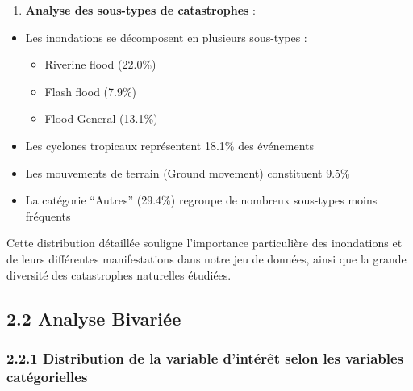 \documentclass[
]{article}
\providecommand{\tightlist}{%
  \setlength{\itemsep}{0pt}\setlength{\parskip}{0pt}}
\begin{document}
\begin{enumerate}
\def\labelenumi{\arabic{enumi}.}
\setcounter{enumi}{2}
\tightlist
\item
  \textbf{Analyse des sous-types de catastrophes} :
\end{enumerate}

\begin{itemize}
\tightlist
\item
  Les inondations se décomposent en plusieurs sous-types :

  \begin{itemize}
  \tightlist
  \item
    Riverine flood (22.0\%)
  \item
    Flash flood (7.9\%)
  \item
    Flood General (13.1\%)
  \end{itemize}
\item
  Les cyclones tropicaux représentent 18.1\% des événements
\item
  Les mouvements de terrain (Ground movement) constituent 9.5\%
\item
  La catégorie ``Autres'' (29.4\%) regroupe de nombreux sous-types moins
  fréquents
\end{itemize}

Cette distribution détaillée souligne l'importance particulière des
inondations et de leurs différentes manifestations dans notre jeu de
données, ainsi que la grande diversité des catastrophes naturelles
étudiées.

\subsection{2.2 Analyse Bivariée}\label{analyse-bivariuxe9e}

\subsubsection{2.2.1 Distribution de la variable d'intérêt selon les
variables
catégorielles}\label{distribution-de-la-variable-dintuxe9ruxeat-selon-les-variables-catuxe9gorielles}
\end{document}
